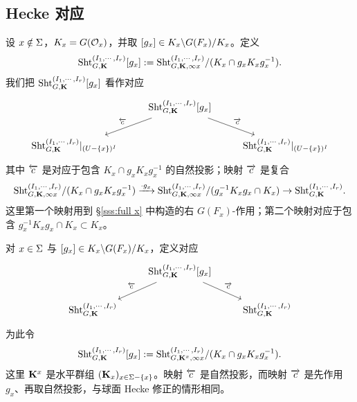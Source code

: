 \subsection{Hecke 对应}


设 $x\notin \Sigma$，$K_{x}=G(\mathcal{O}_{x})$，并取 $[g_{x}]\in K_{x}\backslash G(F_{x})/K_{x}$。定义
\begin{equation*}
 \textup{Sht}^{(I_{1},\cdots, I_{r})}_{G,\mathbf{K}}[g_{x}]:= \textup{Sht}^{(I_{1},\cdots, I_{r})}_{G,\mathbf{K},\infty x}/(K_{x}\cap g_{x}K_{x}g_{x}^{-1}).
\end{equation*}
我们把 $\textup{Sht}^{(I_{1},\cdots, I_{r})}_{G,\mathbf{K}}[g_{x}]$ 看作对应
\begin{equation*}
\begin{tikzcd}
& \Sht^{(I_{1},\cdots, I_{r})}_{G,\bK}[g_{x}] \arrow[dl, "\oll{c}"'] \arrow[dr, "\orr{c}"] & \\
\Sht^{(I_{1},\cdots, I_{r})}_{G,\bK}|_{(U-\{x\})^{I}} & & \Sht^{(I_{1},\cdots, I_{r})}_{G,\bK}|_{(U-\{x\})^{I}}
\end{tikzcd}
\end{equation*}
其中 $\overleftarrow{c}$ 是对应于包含 $K_{x}\cap g_{x}K_{x}g_{x}^{-1}$ 的自然投影；映射 $\overrightarrow{c}$ 是复合
\begin{equation*}
 \textup{Sht}^{(I_{1},\cdots, I_{r})}_{G,\mathbf{K},\infty x}/(K_{x}\cap g_{x}K_{x}g_{x}^{-1})\xrightarrow{\cdot g_{x}} \textup{Sht}^{(I_{1},\cdots, I_{r})}_{G,\mathbf{K},\infty x}/(g_{x}^{-1}K_{x}g_{x}\cap K_{x})\to \textup{Sht}^{(I_{1},\cdots, I_{r})}_{G,\mathbf{K}}.
\end{equation*}
这里第一个映射用到 \S\ref{sss:full x} 中构造的右 $G(F_{x})$-作用；第二个映射对应于包含 $g^{-1}_{x}K_{x}g_{x}\cap K_{x}\subset K_{x}$。


对 $x\in \Sigma$ 与 $[g_{x}]\in  K_{x}\backslash G(F_{x})/K_{x}$，定义对应
\begin{equation}\label{Hk x Sig}
\begin{tikzcd}
& \Sht^{(I_{1},\cdots, I_{r})}_{G,\bK}[g_{x}] \arrow[dl, "\oll{c}"'] \arrow[dr, "\orr{c}"] & \\
\Sht^{(I_{1},\cdots, I_{r})}_{G,\bK} & &  \Sht^{(I_{1},\cdots, I_{r})}_{G,\bK}
\end{tikzcd}
\end{equation}
为此令
\begin{equation*}
\textup{Sht}^{(I_{1},\cdots, I_{r})}_{G,\mathbf{K}}[g_{x}]:=\textup{Sht}^{(I_{1},\cdots, I_{r})}_{G,\mathbf{K}^{x}, \infty x}/(K_{x}\cap g_{x}K_{x}g_{x}^{-1}).
\end{equation*}
这里 $\mathbf{K}^{x}$ 是水平群组 $(\mathbf{K}_{x})_{x\in \Sigma-\{x\}}$。映射 $\overleftarrow{c}$ 是自然投影，而映射 $\overrightarrow{c}$ 是先作用 $g_{x}$、再取自然投影，与球面 Hecke 修正的情形相同。

